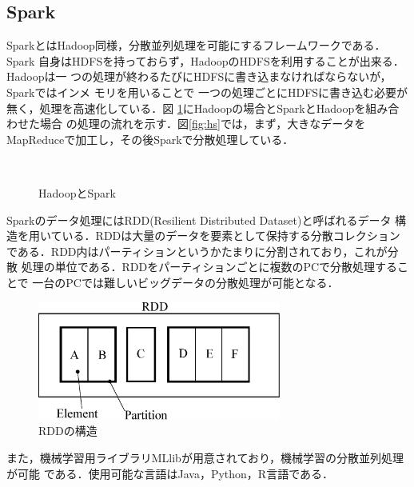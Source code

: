 \documentclass[a4paper,12pt]{jarticle}
\begin{document}
\subsection{Spark}
SparkとはHadoop同様，分散並列処理を可能にするフレームワークである．Spark
自身はHDFSを持っておらず，HadoopのHDFSを利用することが出来る．Hadoopは一
つの処理が終わるたびにHDFSに書き込まなければならないが，Sparkではインメ
モリを用いることで
一つの処理ごとにHDFSに書き込む必要が無く，処理を高速化している．図
\ref{fig:Hadoop_vs_Spark}にHadoopの場合とSparkとHadoopを組み合わせた場合
の処理の流れを示す．図\ref{fig:hs}では，まず，大きなデータを
MapReduceで加工し，その後Sparkで分散処理している．
%
 \begin{figure}
  \begin{center}
   \\
  \end{center}
  \caption{HadoopとSpark}
  \label{fig:Hadoop_vs_Spark}
 \end{figure}
%
Sparkのデータ処理にはRDD(Resilient Distributed Dataset)と呼ばれるデータ
構造を用いている．RDDは大量のデータを要素として保持する分散コレクション
である．RDD内はパーティションというかたまりに分割されており，これが分散
処理の単位である．RDDをパーティションごとに複数のPCで分散処理することで
一台のPCでは難しいビッグデータの分散処理が可能となる．
%
\begin{figure}[htbp]
 \begin{center}
  \includegraphics[width=80mm]{fig/RDD.eps}
  \caption{RDDの構造}
  \label{fig:RDD}
 \end{center}
\end{figure}
%
また，機械学習用ライブラリMLlibが用意されており，機械学習の分散並列処理が可能
である．使用可能な言語はJava，Python，R言語である．
\end{document}

